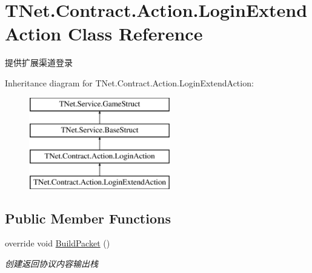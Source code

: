 \hypertarget{class_t_net_1_1_contract_1_1_action_1_1_login_extend_action}{}\section{T\+Net.\+Contract.\+Action.\+Login\+Extend\+Action Class Reference}
\label{class_t_net_1_1_contract_1_1_action_1_1_login_extend_action}


提供扩展渠道登录  


Inheritance diagram for T\+Net.\+Contract.\+Action.\+Login\+Extend\+Action\+:\begin{figure}[H]
\begin{center}
\leavevmode
\includegraphics[height=4.000000cm]{class_t_net_1_1_contract_1_1_action_1_1_login_extend_action}
\end{center}
\end{figure}
\subsection*{Public Member Functions}
\begin{DoxyCompactItemize}
\item 
override void \mbox{\hyperlink{class_t_net_1_1_contract_1_1_action_1_1_login_extend_action_a44cd85d17ec24e8fa99317d243bb2aa2}{Build\+Packet}} ()
\begin{DoxyCompactList}\small\item\em 创建返回协议内容输出栈 \end{DoxyCompactList}\end{DoxyCompactItemize}
